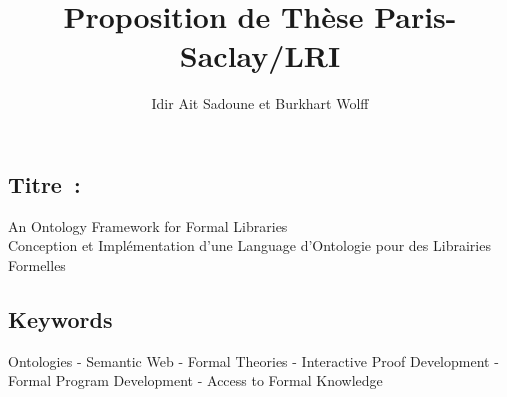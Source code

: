 \documentclass[a4paper,10pt]{article}
\begin{document}
\title{\textbf{Proposition de Thèse Paris-Saclay/LRI}}
\author{Idir Ait Sadoune et Burkhart Wolff}
\date{}

\maketitle

\subsection*{Titre~:}
\begin{center}
\large An Ontology Framework for Formal Libraries \\
          Conception et Implémentation d'une Language d'Ontologie pour des Librairies Formelles
\end{center}



\subsection{Keywords}
Ontologies - Semantic Web - Formal Theories - Interactive Proof Development - Formal Program Development - Access to Formal Knowledge
\end{document}
